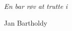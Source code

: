 \clearpage
\thispagestyle{empty}
\vspace*{\fill}
\vspace*{3cm}
\hfill\textit{En bar røv at trutte i}
\par
\hfill\vspace*{4cm} Jan Bartholdy
\vspace*{\fill}
